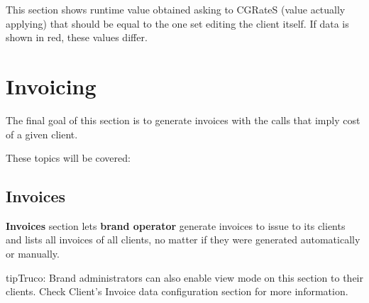 \documentclass[letterpaper,10pt,spanish]{sphinxmanual}
\begin{document}
This section shows runtime value obtained asking to CGRateS (value actually applying) that should be equal to the one
set editing the client itself. If data is shown in red, these values differ.


\section{Invoicing}
\label{administration_portal/brand/invoicing/index::doc}\label{administration_portal/brand/invoicing/index:invoicing}
The final goal of this section is to generate invoices with the calls that imply
cost of a given client.

These topics will be covered:


\subsection{Invoices}
\label{administration_portal/brand/invoicing/invoices:invoices}\label{administration_portal/brand/invoicing/invoices::doc}
\textbf{Invoices} section lets \textbf{brand operator} generate invoices to issue to its clients and lists all invoices of all
clients, no matter if they were generated automatically or manually.

\begin{notice}{tip}{Truco:}
Brand administrators can also enable view mode on this section to their clients. Check Client's Invoice data
configuration section for more information.
\end{notice}
\end{document}
